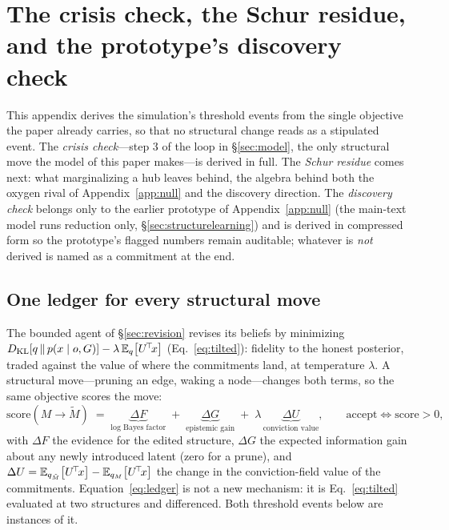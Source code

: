 
\section{The crisis check, the Schur residue, and the prototype's discovery check}
\label{app:crisis-discovery}

This appendix derives the simulation's threshold events from the single objective the paper
already carries, so that no structural change reads as a stipulated event. The \emph{crisis
check}---step 3 of the loop in \S\ref{sec:model}, the only structural move the model of this
paper makes---is derived in full. The \emph{Schur residue} comes next: what marginalizing a
hub leaves behind, the algebra behind both the oxygen rival of Appendix~\ref{app:null} and
the discovery direction. The \emph{discovery check} belongs only to the earlier prototype of
Appendix~\ref{app:null} (the main-text model runs reduction only,
\S\ref{sec:structurelearning}) and is derived in compressed form so the prototype's flagged
numbers remain auditable; whatever is \emph{not} derived is named as a commitment at the
end.

\subsection{One ledger for every structural move}

The bounded agent of \S\ref{sec:revision} revises its beliefs by minimizing
$D_{\mathrm{KL}}\!\left[q\,\middle\|\,p(x\mid o,G)\right]-\lambda\,\mathbb{E}_{q}\!\left[U^{\!\top}\!x\right]$ (Eq.~\ref{eq:tilted}): fidelity to the
honest posterior, traded against the value of where the commitments land, at temperature
$\lambda$. A structural move---pruning an edge, waking a node---changes both terms, so the same
objective scores the move:
\begin{equation}
\mathrm{score}(M\!\to\!\tilde M)
\;=\;
\underbrace{\Delta F}_{\text{log Bayes factor}}
\;+\;
\underbrace{\Delta G}_{\text{epistemic gain}}
\;+\;
\lambda\,\underbrace{\Delta U}_{\text{conviction value}},
\qquad
\text{accept}\iff \mathrm{score}>0,
\label{eq:ledger}
\end{equation}
with $\Delta F$ the evidence for the edited structure, $\Delta G$ the expected information gain
about any newly introduced latent (zero for a prune), and
$\Delta U = \mathbb{E}_{q_{\tilde M}}\!\left[U^{\!\top}\!x\right]-\mathbb{E}_{q_{M}}\!\left[U^{\!\top}\!x\right]$ the change in the
conviction-field value of the commitments. Equation~\eqref{eq:ledger} is not a new mechanism:
it is Eq.~\eqref{eq:tilted} evaluated at two structures and differenced. Both threshold events
below are instances of it.

